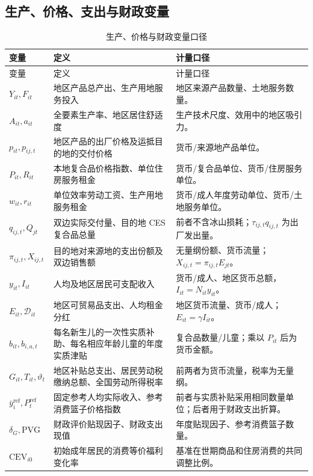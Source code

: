 \documentclass[UTF8,a4paper,zihao=-4,fontset=windows]{ctexart}
\numberwithin{equation}{section}
\begin{document}
\subsection{生产、价格、支出与财政变量}
\small
\begin{longtable}{L{0.23\textwidth}L{0.43\textwidth}L{0.24\textwidth}}
\caption{生产、价格与财政变量口径}\label{tab:notation-production}\\
\toprule
变量 & 定义 & 计量口径\\
\midrule
\endfirsthead
\toprule
变量 & 定义 & 计量口径\\
\midrule
\endhead
\bottomrule
\endfoot
$Y_{it},F_{it}$ & 地区产品总产出、生产用地服务投入 & 地区来源产品数量、土地服务数量。\\
$A_{it},a_{it}$ & 全要素生产率、地区居住舒适度 & 生产技术尺度、效用中的地区吸引力。\\
$p_{it},p_{ij,t}$ & 地区产品的出厂价格及运抵目的地的交付价格 & 货币/来源地产品单位。\\
$P_{it},R_{it}$ & 本地复合品价格指数、单位住房服务租金 & 货币/复合品单位、货币/住房服务单位。\\
$w_{it},r_{it}$ & 单位效率劳动工资、生产用地服务租金 & 货币/成人年度劳动单位、货币/土地服务单位。\\
$q_{ij,t},Q_{jt}$ & 双边实际交付量、目的地 CES 复合品总量 & 前者不含冰山损耗；$\tau_{ij,t}q_{ij,t}$ 为出厂发出量。\\
$\pi_{ij,t},X_{ij,t}$ & 目的地对来源地的支出份额及双边销售额 & 无量纲份额、货币流量；$X_{ij,t}=\pi_{ij,t}E_{jt}$。\\
$y_{it},I_{it}$ & 人均及地区居民可支配收入 & 货币/成人、地区货币总额，$I_{it}=N_{it}y_{it}$。\\
$E_{it},\mathcal D_{it}$ & 地区可贸易品支出、人均租金分红 & 地区货币流量、货币/成人；$E_{it}=\gamma I_{it}$。\\
$b_{it},b_{i,a,t}$ & 每名新生儿的一次性实质补助、每名相应年龄儿童的年度实质津贴 & 复合品数量/儿童；乘以 $P_{it}$ 后为货币金额。\\
$G_{it},T_{it},\vartheta_t$ & 地区补贴总支出、居民劳动税缴纳总额、全国劳动所得税率 & 前两者为货币流量，税率为无量纲。\\
$\bar y_i^{\mathrm{ref}},P_t^{\mathrm{ref}}$ & 固定参考人均实际收入、参考消费篮子价格指数 & 前者与实质补贴采用相同数量单位；后者用于财政支出折算。\\
$\delta_G,\mathrm{PVG}$ & 财政评价贴现因子、财政支出现值 & 年度贴现因子、参考消费篮子数量。\\
$\mathrm{CEV}_{i0}$ & 初始成年居民的消费等价福利变化率 & 基准在世期商品和住房消费的共同调整比例。\\
\end{longtable}
\normalsize
\end{document}
